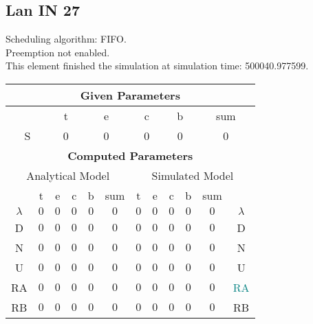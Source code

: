 \documentclass{article}
\begin{document}
\subsection{Lan IN 27}
Scheduling algorithm: FIFO.\\Preemption not enabled. \\This element finished the simulation at simulation time: 500040.977599.\\
\begin{table}[H]\centering\begin{tabular}{@{}c|cccc|c||cccc|c|c@{}}\toprule\multicolumn{12}{c}{\textbf{Given Parameters}}\\\midrule\multicolumn{2}{c|}{ } & \multicolumn{2}{c}{t} & \multicolumn{2}{c}{e} & \multicolumn{2}{c}{c} & \multicolumn{2}{c}{b} & \multicolumn{2}{|c}{sum} \\ \midrule\multicolumn{2}{c|}{S} & \multicolumn{2}{c}{0} & \multicolumn{2}{c}{0} & \multicolumn{2}{c}{0} & \multicolumn{2}{c}{0} & \multicolumn{2}{|c}{0}\\ \midrule\midrule\multicolumn{12}{c}{\textbf{Computed Parameters}}\\ \midrule\multicolumn{6}{c||}{Analytical Model} & \multicolumn{6}{c}{Simulated Model}\\ 
 \midrule & t & e & c & b & sum & t & e & c & b & sum &  \\ \midrule$\lambda$ &$0$ & $0$ & $0$ & $0$ & $0$ & $0$ & $0$ & $0$ & $0$ & $0$& $\lambda$ \\D & $0$ & $0$ & $0$ & $0$ & $0$ & $0$ & $0$ & $0$ & $0$ & $0$& D\\N & $0$ & $0$ & $0$ & $0$ & $0$ & $0$ & $0$ & $0$ & $0$ & $0$& N\\U & $0$ & $0$ & $0$ & $0$ & $0$ & $0$ & $0$ & $0$ & $0$ & $0$& U\\RA & $0$ & $0$ & $0$ & $0$ & $0$ & $0$ & $0$ & $0$ & $0$ & $0$& \textcolor{teal}{RA}\\RB & $0$ & $0$ & $0$ & $0$ & $0$ & $0$ & $0$ & $0$ & $0$ & $0$& RB\\
\bottomrule
\end{tabular}
\end{table}
\filbreak
\end{document}
